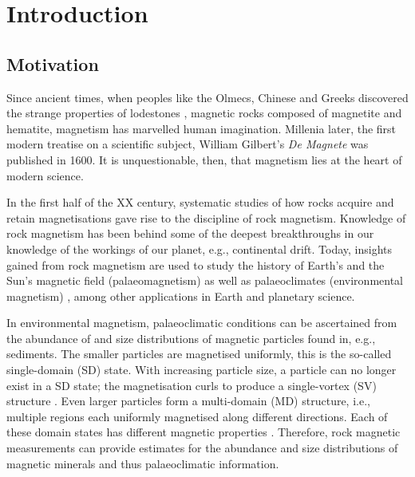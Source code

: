 \chapter{Introduction}
\label{ch:intro}
\fancyhead[C]{}
\fancyhead[R]{}
\fancyfoot[C]{\thepage}

\section{Motivation}
Since ancient times, when peoples like the Olmecs, Chinese and Greeks discovered the strange properties of lodestones \citep{Carlson1975,Evans1977,May1981}, magnetic rocks composed of magnetite and hematite, magnetism has marvelled human imagination. Millenia later, the first modern treatise on a scientific subject, William Gilbert's \emph{De Magnete} was published in 1600. It is unquestionable, then, that magnetism lies at the heart of modern science.\par

In the first half of the XX century, systematic studies of how rocks acquire and retain magnetisations \citep{Koenigsberger1938,Thellier1938,Nagata1943} gave rise to the discipline of rock magnetism. Knowledge of rock magnetism has been behind some of the deepest breakthroughs in our knowledge of the workings of our planet, e.g., continental drift. Today, insights gained from rock magnetism are used to study the history of Earth's and the Sun's magnetic field (palaeomagnetism) \citep{Dunlop} as well as palaeoclimates (environmental magnetism) \citep{Evans}, among other applications in Earth and planetary science.\par

In environmental magnetism, palaeoclimatic conditions can be ascertained from the abundance of and size distributions of magnetic particles found in, e.g., sediments. The smaller particles are magnetised uniformly, this is the so-called single-domain (SD) state. With increasing particle size, a particle can no longer exist in a SD state; the magnetisation curls to produce a single-vortex (SV) structure \citep{Roberts2017}. Even larger particles form a multi-domain (MD) structure, i.e., multiple regions each uniformly magnetised along different directions. Each of these domain states has different magnetic properties \citep{Dunlop}. Therefore, rock magnetic measurements can provide estimates for the abundance and size distributions of magnetic minerals and thus palaeoclimatic information.\par

